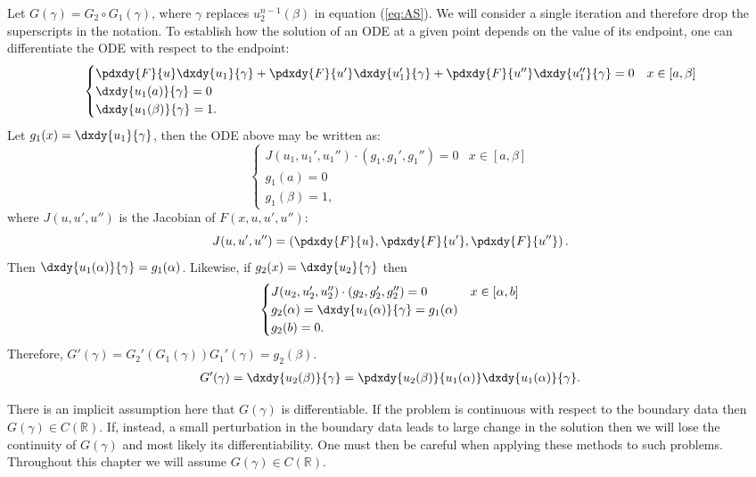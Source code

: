 \documentclass{book}
\begin{document}
Let $G(\gamma) = G_2 \circ G_1(\gamma)$, where $\gamma$ replaces $u^{n-1}_2(\beta)$ in equation (\ref{eq:AS}).
We will consider a single iteration and therefore drop the superscripts in the notation.
To establish how the solution of an ODE at a given point depends on the value of its endpoint, one can differentiate the ODE with respect to the endpoint:
\begin{align*}
\begin{cases} \pdxdy{F}{u} \dxdy{u_1}{\gamma} + \pdxdy{F}{u'} \dxdy{u_1'}{\gamma} + \pdxdy{F}{u''} \dxdy{u_1''}{\gamma} = 0 & x \in [a,\beta] \\
\dxdy{u_1(a)}{\gamma} = 0 \\
\dxdy{u_1(\beta)}{\gamma} = 1. \end{cases}
\end{align*}
Let $g_1(x) = \dxdy{u_1}{\gamma}$, then the ODE above may be written as:
\begin{equation*}
\begin{cases} J(u_1,u_1',u_1'') \cdot (g_1, g_1', g_1'') = 0 & x \in [a,\beta] \\ g_1(a) = 0 \\ g_1(\beta) = 1, \end{cases}
\end{equation*}
where $J(u,u',u'')$ is the Jacobian of $F(x,u,u',u'')$:
\begin{equation} \label{eq:Jacobian}
J(u,u',u'') = \left ( \pdxdy{F}{u}, \pdxdy{F}{u'}, \pdxdy{F}{u''} \right ) .
\end{equation}
Then $\dxdy{u_1(\alpha)}{\gamma} = g_1(\alpha)$.
Likewise, if $g_2(x) = \dxdy{u_2}{\gamma}$ then
\begin{equation*}
\begin{cases} J(u_2,u_2',u_2'') \cdot (g_2, g_2', g_2'') = 0 & x \in [\alpha,b] \\
g_2(\alpha) = \dxdy{u_1(\alpha)}{\gamma} = g_1(\alpha) \\ g_2(b) = 0 . \end{cases}
\end{equation*}
Therefore, $G'(\gamma) = G_2'(G_1(\gamma)) G_1'(\gamma) = g_2(\beta)$.
\begin{align*}
G'(\gamma) = \dxdy{u_2(\beta)}{\gamma} = \pdxdy{u_2(\beta)}{u_1(\alpha)} \dxdy{u_1(\alpha)}{\gamma} .
\end{align*}

There is an implicit assumption here that $G(\gamma)$ is differentiable.
If the problem is continuous with respect to the boundary data then $G(\gamma) \in C(\mathbb{R})$.
If, instead, a small perturbation in the boundary data leads to large change in the solution then we will lose the continuity of $G(\gamma)$ and most likely its differentiability.
One must then be careful when applying these methods to such problems.
Throughout this chapter we will assume $G(\gamma) \in C(\mathbb{R})$.
\end{document}
